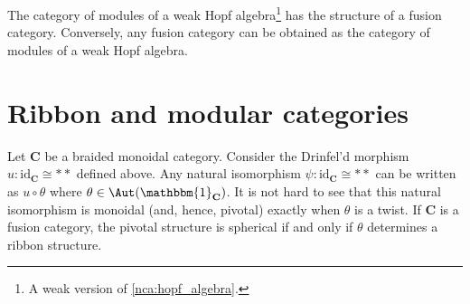     \begin{theorem}
        The category of modules of a weak Hopf algebra\footnote{A weak version of \cref{nca:hopf_algebra}.} has the structure of a fusion category. Conversely, any fusion category can be obtained as the category of modules of a weak Hopf algebra.
    \end{theorem}

\section{Ribbon and modular categories}


    \begin{property}
        Let $\mathbf{C}$ be a braided monoidal category. Consider the Drinfel'd morphism $u:\mathrm{id}_{\mathbf{C}}\cong\ast\ast$ defined above. Any natural isomorphism $\psi:\mathrm{id}_{\mathbf{C}}\cong\ast\ast$ can be written as $u\circ\theta$ where $\theta\in\Aut(\mathbbm{1}_{\mathbf{C}})$. It is not hard to see that this natural isomorphism is monoidal (and, hence, pivotal) exactly when $\theta$ is a twist. If $\mathbf{C}$ is a fusion category, the pivotal structure is spherical if and only if $\theta$ determines a ribbon structure.
    \end{property}


